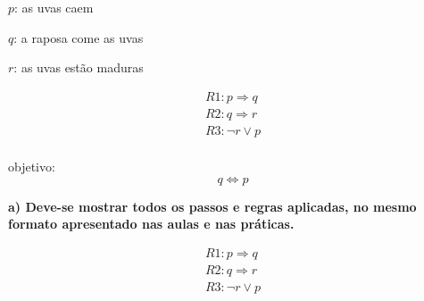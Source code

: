 $p$: as uvas caem 

$q$: a raposa come as uvas 

$r$: as uvas estão maduras

\begin{equation*}
    \begin{gathered}
        R1: p \Rightarrow q \\
        R2: q \Rightarrow r \\
        R3: \neg{r} \lor p \\
    \end{gathered}
\end{equation*}

objetivo: 
\begin{equation*}
    q \Leftrightarrow p
\end{equation*}



\begin{adjustwidth}{1em}{}
\textbf{a) Deve-se mostrar todos os passos e regras aplicadas, no mesmo formato
apresentado nas aulas e nas práticas.}
\end{adjustwidth}






\begin{equation*}
    \begin{gathered}
        R1: p \Rightarrow q \\
        R2: q \Rightarrow r \\
        R3: \neg{r} \lor p \\
    \end{gathered}
\end{equation*}


